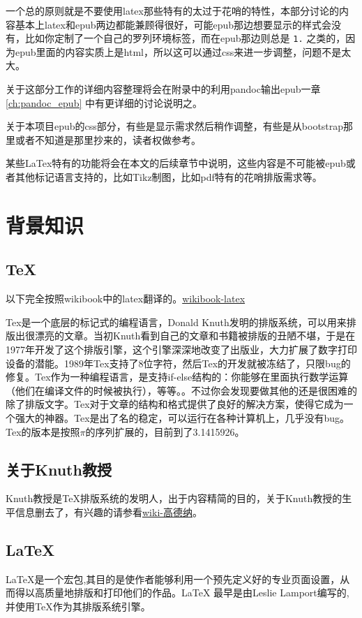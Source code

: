 \documentclass[12pt,oneside]{book}
\begin{document}
一个总的原则就是不要使用latex那些特有的太过于花哨的特性，本部分讨论的内容基本上latex和epub两边都能兼顾得很好，可能epub那边想要显示的样式会没有，比如你定制了一个自己的罗列环境标签，而在epub那边则总是 \verb+1.+ 之类的，因为epub里面的内容实质上是html，所以这可以通过css来进一步调整，问题不是太大。

关于这部分工作的详细内容整理将会在附录中的利用pandoc输出epub一章\ref{ch:pandoc_epub} 中有更详细的讨论说明之。

关于本项目epub的css部分，有些是显示需求然后稍作调整，有些是从bootstrap那里或者不知道是那里抄来的，读者权做参考。

某些LaTex特有的功能将会在本文的后续章节中说明，这些内容是不可能被epub或者其他标记语言支持的，比如Tikz制图，比如pdf特有的花哨排版需求等。


\chapter{背景知识}
\section{TeX}
以下完全按照wikibook中的latex翻译的。\href{http://en.wikibooks.org/wiki/LaTeX/Introduction}{wikibook-latex}

Tex是一个底层的标记式的编程语言，Donald Knuth发明的排版系统，可以用来排版出很漂亮的文章。当初Knuth看到自己的文章和书籍被排版的丑陋不堪，于是在1977年开发了这个排版引擎，这个引擎深深地改变了出版业，大力扩展了数字打印设备的潜能。1989年Tex支持了8位字符，然后Tex的开发就被冻结了，只限bug的修复。Tex作为一种编程语言，是支持if-else结构的：你能够在里面执行数学运算（他们在编译文件的时候被执行），等等。。不过你会发现要做其他的还是很困难的除了排版文字。Tex对于文章的结构和格式提供了良好的解决方案，使得它成为一个强大的神器。Tex是出了名的稳定，可以运行在各种计算机上，几乎没有bug。Tex的版本是按照$\pi$的序列扩展的，目前到了3.1415926。

\section{关于Knuth教授}
Knuth教授是\TeX 排版系统的发明人，出于内容精简的目的，关于Knuth教授的生平信息删去了，有兴趣的请参看\href{http://zh.wikipedia.org/wiki/%E9%AB%98%E5%BE%B7%E7%BA%B3}{wiki-高德纳}。

\section{LaTeX}
LaTeX是一个宏包,其目的是使作者能够利用一个预先定义好的专业页面设置，从而得以高质量地排版和打印他们的作品。LaTeX 最早是由Leslie Lamport编写的,并使用\TeX 作为其排版系统引擎\cite{lshort}。
\end{document}
